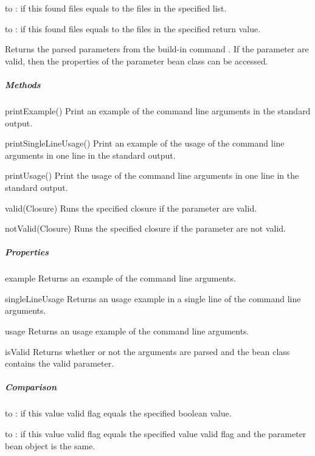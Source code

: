 \begin{compactitem}
%
\item to : if this found files equals to the files in the specified
list.
%
\item to : if this found files equals to the files in the specified
return value.
%
\end{compactitem}

\label{par:parametervalue}

Returns the parsed parameters from the build-in command .
If the parameter are valid, then the properties of the parameter bean class
can be accessed.

\subparagraph{Methods}

\begin{asparadesc}
%
\item[printExample()] Print an example of the command line arguments in the
standard output.
%
\item[printSingleLineUsage()] Print an example of the usage of the command
line arguments in one line in the standard output.
%
\item[printUsage()] Print the usage of the command line arguments in one line in the standard
output.
%
\item[valid(Closure)] Runs the specified closure if the parameter are valid.
%
\item[notValid(Closure)] Runs the specified closure if the parameter are not valid.
%
\end{asparadesc}

\subparagraph{Properties}

\begin{asparadesc}
%
\item[example] Returns an example of the command line arguments.
%
\item[singleLineUsage] Returns an usage example in a single line of the
command line arguments.
%
\item[usage] Returns an usage example of the command line arguments.
%
\item[isValid] Returns whether or not the arguments are parsed and the bean class
contains the valid parameter.
%
\end{asparadesc}

\subparagraph{Comparison}

\begin{compactitem}
%
\item to : if this value valid flag equals the specified boolean value.
%
\item to : if this value valid flag equals the specified value valid
flag and the parameter bean object is the same.
%
\end{compactitem}



